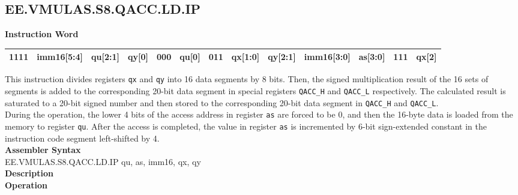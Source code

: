 \subsection{EE.VMULAS.S8.QACC.LD.IP}\label{instruction:EEVMULASS8QACCLDIP}
\setlength\tabcolsep{6pt}
\textbf{Instruction Word} \\
\begin{tabular}{|c|c|c|c|c|c|c|c|c|c|c|c|c|}
	\hline
	1111 & imm16[5:4] & qu[2:1] & qy[0] & 000 & qu[0] & 011 & qx[1:0] & qy[2:1] & imm16[3:0] & as[3:0] & 111 & qx[2] \\
	\hline
\end{tabular}
This instruction divides registers \lstinline{qx} and \lstinline{qy} into 16 data segments by 8 bits. Then, the signed multiplication result of the 16 sets of segments is added to the corresponding 20-bit data segment in special registers \lstinline{QACC_H} and \lstinline{QACC_L} respectively. The calculated result is saturated to a 20-bit signed number and then stored to the corresponding 20-bit data segment in \lstinline{QACC_H} and \lstinline{QACC_L}.\\
During the operation, the lower 4 bits of the access address in register \lstinline{as} are forced to be 0, and then the 16-byte data is loaded from the memory to register \lstinline{qu}. After the access is completed, the value in register \lstinline{as} is incremented by 6-bit sign-extended constant in the instruction code segment left-shifted by 4.\\
\textbf{Assembler Syntax} \\
EE.VMULAS.S8.QACC.LD.IP qu, as, imm16, qx, qy \\
\textbf{Description} \\
\textbf{Operation}
